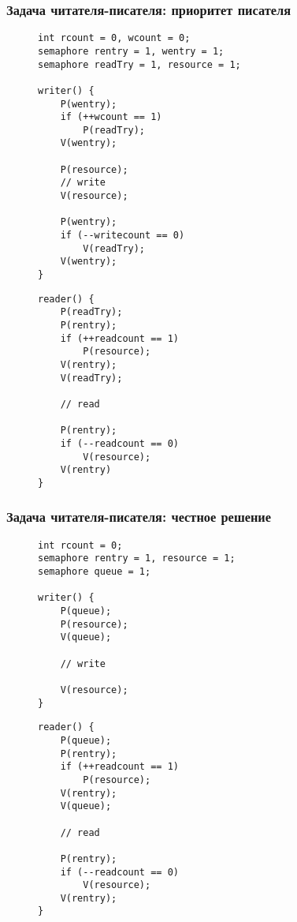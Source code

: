 \documentclass[aspectratio=169, pdf, 8pt, unicode]{beamer}
\begin{document}
\begin{frame}[fragile]
\frametitle{Задача читателя-писателя: приоритет писателя}
\begin{figure}[H]
\begin{minipage}{0.4\textwidth}
\begin{verbatim}
int rcount = 0, wcount = 0;
semaphore rentry = 1, wentry = 1;
semaphore readTry = 1, resource = 1;

writer() {
    P(wentry);
    if (++wcount == 1)
        P(readTry);
    V(wentry);

    P(resource);
    // write
    V(resource);

    P(wentry);
    if (--writecount == 0)
        V(readTry);
    V(wentry);
}
\end{verbatim}
\end{minipage}
\begin{minipage}{0.4\textwidth}
\begin{verbatim}
reader() {
    P(readTry);
    P(rentry);
    if (++readcount == 1)
        P(resource);
    V(rentry);
    V(readTry);

    // read

    P(rentry);
    if (--readcount == 0)
        V(resource);
    V(rentry)
}
\end{verbatim}
\end{minipage}
\end{figure}
\end{frame}

\begin{frame}[fragile]
\frametitle{Задача читателя-писателя: честное решение}
\begin{figure}[H]
\begin{minipage}{0.4\textwidth}
\begin{verbatim}
int rcount = 0;
semaphore rentry = 1, resource = 1;
semaphore queue = 1;

writer() {
    P(queue);
    P(resource);
    V(queue);

    // write

    V(resource);
}
\end{verbatim}
\end{minipage}
\begin{minipage}{0.4\textwidth}
\begin{verbatim}
reader() {
    P(queue);
    P(rentry);
    if (++readcount == 1)
        P(resource);
    V(rentry);
    V(queue);

    // read

    P(rentry);
    if (--readcount == 0)
        V(resource);
    V(rentry);
}
\end{verbatim}
\end{minipage}
\end{figure}
\end{frame}
\end{document}
